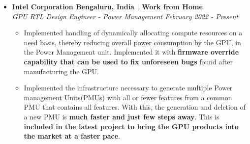 \documentclass[a4paper,11pt]{article}
\newcommand{\isep}{-2 pt}
\newcommand{\spsep}{-0.75cm}
\begin{document}
\begin{itemize}
	\item \textbf{Intel Corporation \hfill Bengaluru, India | Work from Home} \\
	\emph{GPU RTL Design Engineer - Power Management \hfill February 2022 - Present} \\[\spsep]
		\begin{itemize} \itemsep \isep
			\item Implemented handling of dynamically allocating compute resources on a need basis, thereby reducing overall power consumption by the GPU, in the Power Management unit. Implemented it with \textbf{firmware override capability that can be used to fix unforeseen bugs} found after manufacturing the GPU.
			\item Implemented the infrastructure necessary to generate multiple Power management Units(PMUs) with all or fewer features from a common PMU that contains all features. With this, the generation and deletion of a new PMU is \textbf{much faster and just few steps away}. This is \textbf{included in the latest project to bring the GPU products into the market at a faster pace}.
			

\end{itemize}
\end{itemize}
\end{document}
